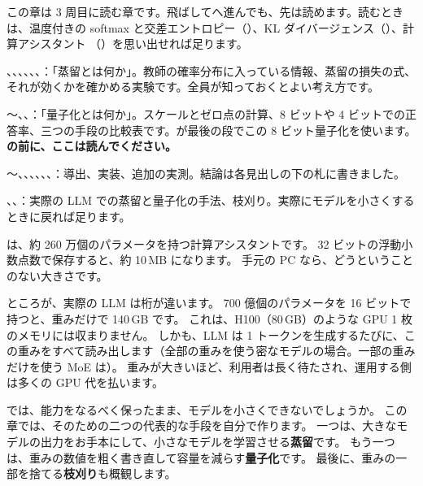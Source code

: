 \begin{readingguide}
\item[\rgpre] この章は 3 周目に読む章です。飛ばしてへ進んでも、先は読めます。読むときは、温度付きの softmax と交差エントロピー（）、KL ダイバージェンス（）、計算アシスタント （）を思い出せれば足ります。
\item[\rgmust] 、、、、、、：「蒸留とは何か」。教師の確率分布に入っている情報、蒸留の損失の式、それが効くかを確かめる実験です。全員が知っておくとよい考え方です。
\item[\rgmust] 〜、、：「量子化とは何か」。スケールとゼロ点の計算、8 ビットや 4 ビットでの正答率、三つの手段の比較表です。が最後の段でこの 8 ビット量子化を使います。\textbf{の前に、ここは読んでください。}
\item[\rgskim] 〜、、、、、、：導出、実装、追加の実測。結論は各見出しの下の札に書きました。
\item[\rglater] 、、：実際の LLM での蒸留と量子化の手法、枝刈り。実際にモデルを小さくするときに戻れば足ります。
\end{readingguide}

 は、約 260 万個のパラメータを持つ計算アシスタントです。
32 ビットの浮動小数点数で保存すると、約 10\,MB になります。
手元の PC なら、どうということのない大きさです。

ところが、実際の LLM は桁が違います。
700 億個のパラメータを 16 ビットで持つと、重みだけで 140\,GB です。
これは、H100（80\,GB）のような GPU 1 枚のメモリには収まりません。
しかも、LLM は 1 トークンを生成するたびに、この重みをすべて読み出します（全部の重みを使う密なモデルの場合。一部の重みだけを使う MoE は）。
重みが大きいほど、利用者は長く待たされ、運用する側は多くの GPU 代を払います。

では、能力をなるべく保ったまま、モデルを小さくできないでしょうか。
この章では、そのための二つの代表的な手段を自分で作ります。
一つは、大きなモデルの出力をお手本にして、小さなモデルを学習させる\textbf{蒸留}です。
もう一つは、重みの数値を粗く書き直して容量を減らす\textbf{量子化}です。
最後に、重みの一部を捨てる\textbf{枝刈り}も概観します。

